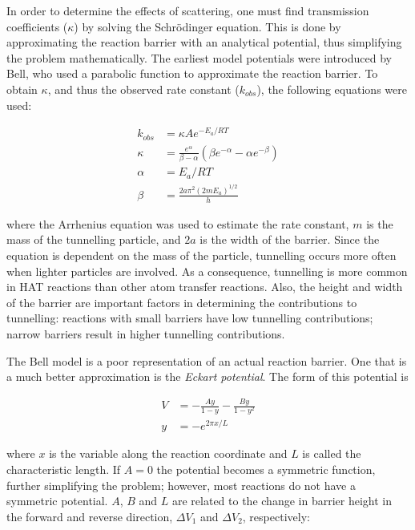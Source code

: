 \begin{doublespace}
In order to determine the effects of scattering, one must find transmission
coefficients ($\kappa$) by solving the Schr{\"o}dinger
equation.\cite{Griffiths2016} This is done by approximating the reaction
barrier with an analytical potential, thus simplifying the problem
mathematically. The earliest model potentials were introduced by Bell, who used
a parabolic function to approximate the reaction barrier.\cite{Bell1980} To
obtain $\kappa$, and thus the observed rate constant ($k_{obs}$), the following
equations were used:

\begin{align}
  k_{obs} &= \kappa A e^{-E_a/RT}  \\
\kappa &= \frac{e^\alpha}{\beta-\alpha} \left(\beta e^{-\alpha} - \alpha
  e^{-\beta} \right) \\
  \alpha &= E_a/RT \\
  \beta &= \frac{2a\pi^2(2mE_a)^{1/2}}{h}
\end{align}

\noindent where the Arrhenius equation was used to estimate the rate constant,
$m$ is the mass of the tunnelling particle, and $2a$ is the width of the
barrier. Since the equation is dependent on the mass of the particle,
tunnelling occurs more often when lighter particles are involved. As a
consequence, tunnelling is more common in HAT reactions than other atom
transfer reactions. Also, the height and width of the barrier are important
factors in determining the contributions to tunnelling: reactions with small
barriers have low tunnelling contributions; narrow barriers result in higher
tunnelling contributions.

The Bell model is a poor representation of an actual reaction barrier. One
that is a much better approximation is the \emph{Eckart
potential}.\cite{Johnston1962} The form of this potential is

\begin{align}
  V &= -\frac{Ay}{1-y} - \frac{By}{1-y^2} \\
  y &= -e^{2\pi x/L}
\end{align}

\noindent where $x$ is the variable along the reaction coordinate and $L$ is
called the characteristic length. If $A=0$ the potential becomes a symmetric
function, further simplifying the problem; however, most reactions do not have
a symmetric potential. $A$, $B$ and $L$ are related to the change in barrier
height in the forward and reverse direction, $\Delta V_1$ and $\Delta V_2$,
respectively:


\end{doublespace}
